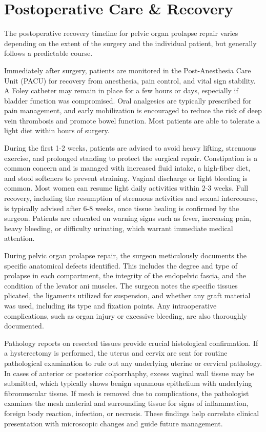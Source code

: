 \section*{Postoperative Care \& Recovery}
The postoperative recovery timeline for pelvic organ prolapse repair varies depending on the extent of the surgery and the individual patient, but generally follows a predictable course.

Immediately after surgery, patients are monitored in the Post-Anesthesia Care Unit (PACU) for recovery from anesthesia, pain control, and vital sign stability. A Foley catheter may remain in place for a few hours or days, especially if bladder function was compromised. Oral analgesics are typically prescribed for pain management, and early mobilization is encouraged to reduce the risk of deep vein thrombosis and promote bowel function. Most patients are able to tolerate a light diet within hours of surgery.

During the first 1-2 weeks, patients are advised to avoid heavy lifting, strenuous exercise, and prolonged standing to protect the surgical repair. Constipation is a common concern and is managed with increased fluid intake, a high-fiber diet, and stool softeners to prevent straining. Vaginal discharge or light bleeding is common. Most women can resume light daily activities within 2-3 weeks. Full recovery, including the resumption of strenuous activities and sexual intercourse, is typically advised after 6-8 weeks, once tissue healing is confirmed by the surgeon. Patients are educated on warning signs such as fever, increasing pain, heavy bleeding, or difficulty urinating, which warrant immediate medical attention.

During pelvic organ prolapse repair, the surgeon meticulously documents the specific anatomical defects identified. This includes the degree and type of prolapse in each compartment, the integrity of the endopelvic fascia, and the condition of the levator ani muscles. The surgeon notes the specific tissues plicated, the ligaments utilized for suspension, and whether any graft material was used, including its type and fixation points. Any intraoperative complications, such as organ injury or excessive bleeding, are also thoroughly documented.

Pathology reports on resected tissues provide crucial histological confirmation. If a hysterectomy is performed, the uterus and cervix are sent for routine pathological examination to rule out any underlying uterine or cervical pathology. In cases of anterior or posterior colporrhaphy, excess vaginal wall tissue may be submitted, which typically shows benign squamous epithelium with underlying fibromuscular tissue. If mesh is removed due to complications, the pathologist examines the mesh material and surrounding tissue for signs of inflammation, foreign body reaction, infection, or necrosis. These findings help correlate clinical presentation with microscopic changes and guide future management.

